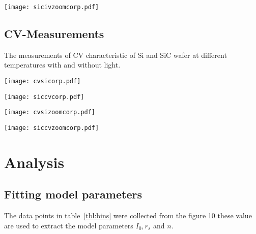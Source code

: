 \documentclass[letterpaper,12pt]{article}
\begin{document}
\noindent%
\begin{minipage}[b]{0.48\textwidth}
    \texttt{[image: sicivzoomcorp.pdf]}
   \label{visina8}%
    \label{fig:2}
\end{minipage}



\subsection{CV-Measurements}
The measurements of CV characteristic of Si and SiC wafer at different temperatures with and without light.

\noindent%
  \begin{minipage}[b]{0.5\textwidth}
    \texttt{[image: cvsicorp.pdf]}
   \label{visina8}%
    \label{fig:3}
  \end{minipage}
  \begin{minipage}[b]{0.5\textwidth}
    \texttt{[image: siccvcorp.pdf]}
    \label{visina8}%
    \label{fig:4}
 \end{minipage}
 
 \noindent%
  \begin{minipage}[b]{0.5\textwidth}
    \texttt{[image: cvsizoomcorp.pdf]}
   \label{visina8}%
    \label{fig:3}
  \end{minipage}
  \begin{minipage}[b]{0.5\textwidth}
    \texttt{[image: siccvzoomcorp.pdf]}
    \label{visina8}%
    \label{fig:4}
 \end{minipage}
 
 
\section{Analysis}
\subsection{Fitting model parameters}
The data points in table~\ref{tbl:bins} were collected from the figure 10 these value are used to extract the model parameters $I_0, r_s $ and $n$. 
\bigskip
\end{document}
